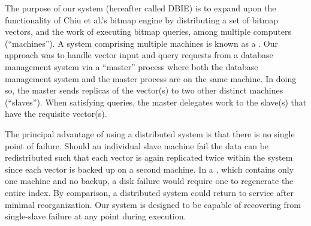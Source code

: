 %
The purpose of our system (hereafter called DBIE) is to expand upon the
functionality of Chiu et al.'s bitmap engine by distributing a set of bitmap
vectors, and the work of executing bitmap queries, among multiple computers
(``machines''). A system comprising multiple machines is known as a
. Our approach was to handle vector input and query
requests from a database management system via a ``master'' process where both
the database management system and the master process are on the same machine.
In doing so, the master sends replicas of the vector(s) to two other distinct
machines (``slaves''). When satisfying queries, the master delegates work to
the slave(s) that have the requisite vector(s).
\par
The principal advantage of using a distributed system is that there is no
single point of failure. Should an individual slave machine fail the data can
be redistributed such that each vector is again replicated twice within the
system since each vector is backed up on a second machine. In a
, which contains only one machine and no backup, a
disk failure would require one to regenerate the entire index. By comparison,
a distributed system could return to service after minimal reorganization. Our
system is designed to be capable of recovering from single-slave failure at any
point during execution.
%
